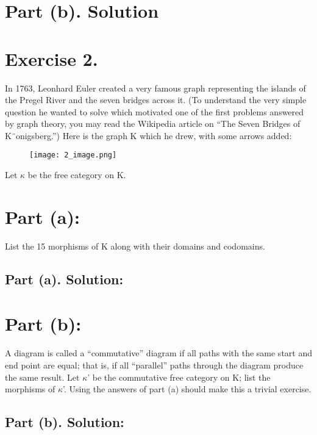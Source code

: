 \documentclass{article}
\begin{document}
\section*{Part (b). Solution}

\newpage


\section*{Exercise 2. }

\begin{mdframed}In 1763, Leonhard Euler created a very famous graph representing the islands of the
    Pregel River and the seven bridges across it. (To understand the very simple question he wanted to
    solve which motivated one of the first problems answered by graph theory, you may read the Wikipedia
    article on “The Seven Bridges of K¨onigsberg.”) Here is the graph K which he drew, with some arrows
    added:
\end{mdframed}
   
\begin{figure}[h!]
    \centering
    \texttt{[image: 2\_image.png]} %
    \label{fig:sample-image}
\end{figure} 

Let $\kappa$ be the free category on K.
\section*{Part (a):} List the 15 morphisms of K along with their domains and codomains.
\subsection*{Part (a). Solution:}


\newpage

\section*{Part (b):} A diagram is called a “commutative” diagram if all paths with the same start and end point
are equal; that is, if all “parallel” paths through the diagram produce the same result. Let $\kappa$' be the
commutative free category on K; list the morphisms of $\kappa$'. Using the answers of part (a) should make
this a trivial exercise.

\subsection*{Part (b). Solution:}
\end{document}
